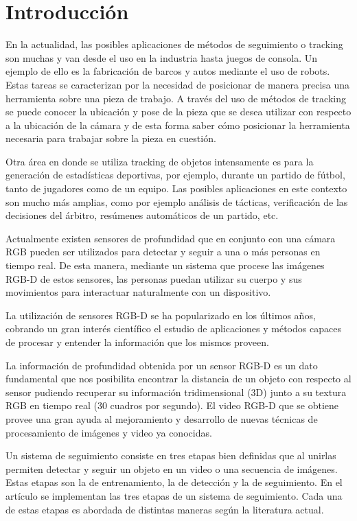 \chapter{Introducción}
En la actualidad, las posibles aplicaciones de métodos de seguimiento o tracking son muchas y van desde el uso en la industria hasta juegos de consola. Un ejemplo de ello es la fabricación de barcos y autos mediante el uso de robots. Estas tareas se caracterizan por la necesidad de posicionar de manera precisa una herramienta sobre una pieza de trabajo. A través del uso de métodos de tracking se puede conocer la ubicación y pose de la pieza que se desea utilizar con respecto a la ubicación de la cámara y de esta forma saber cómo posicionar la herramienta necesaria para trabajar sobre la pieza en cuestión.

Otra área en donde se utiliza tracking de objetos intensamente es para la generación de estadísticas deportivas, por ejemplo, durante un partido de fútbol, tanto de jugadores como de un equipo. Las posibles aplicaciones en este contexto son mucho más amplias, como por ejemplo análisis de tácticas, verificación de las decisiones del árbitro, resúmenes automáticos de un partido, etc.

Actualmente existen sensores de profundidad que en conjunto con una cámara RGB pueden ser utilizados para detectar y seguir a una o más personas en tiempo real. De esta manera, mediante un sistema que procese las imágenes RGB-D de estos sensores, las personas puedan utilizar su cuerpo y sus movimientos para interactuar naturalmente con un dispositivo.

La utilización de sensores RGB-D se ha popularizado en los últimos años, cobrando un gran interés científico el estudio de aplicaciones y métodos capaces de procesar y entender la información que los mismos proveen.

La información de profundidad obtenida por un sensor RGB-D es un dato fundamental que nos posibilita encontrar la distancia de un objeto con respecto al sensor pudiendo recuperar su información tridimensional (3D) junto a su textura RGB en tiempo real (30 cuadros por segundo). El video RGB-D que se obtiene provee una gran ayuda al mejoramiento y desarrollo de nuevas técnicas de procesamiento de imágenes y video ya conocidas.

Un sistema de seguimiento consiste en tres etapas bien definidas que al unirlas permiten detectar y seguir un objeto en un video o una secuencia de imágenes. Estas etapas son la de entrenamiento, la de detección y la de seguimiento. En el artículo \cite{park2011texture} se implementan las tres etapas de un sistema de seguimiento. Cada una de estas etapas es abordada de distintas maneras según la literatura actual.

